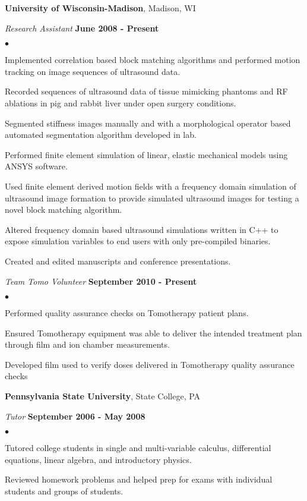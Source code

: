 \documentclass[margin,line]{res}
\newenvironment{list2}{
  \begin{list}{$\bullet$}{%
      \setlength{\itemsep}{0in}
      \setlength{\parsep}{0in} \setlength{\parskip}{0in}
      \setlength{\topsep}{0in} \setlength{\partopsep}{0in}
      \setlength{\leftmargin}{0.2in}}}{\end{list}}
\begin{document}
\begin{resume}
{\bf University of Wisconsin-Madison}, Madison, WI

\vspace{-.3cm}
{\em Research Assistant} \hfill {\bf June 2008 - Present} \\
\begin{list2}
\item Implemented correlation based block matching algorithms and performed motion tracking on image sequences of ultrasound data.
\item Recorded sequences of ultrasound data of tissue mimicking phantoms and RF ablations in pig and rabbit liver under open surgery conditions.
\item Segmented stiffness images manually and with a morphological operator based automated segmentation algorithm developed in lab. 
\item Performed finite element simulation of linear, elastic mechanical models using ANSYS software.
\item Used finite element derived motion fields with a frequency domain simulation of ultrasound image formation
 to provide simulated ultrasound images for testing a novel block matching algorithm. 
\item Altered frequency domain based ultrasound simulations written in C++ to expose simulation variables to end users with only pre-compiled binaries.
\item Created and edited manuscripts and conference presentations.
\end{list2}


\vspace{-.3cm}
{\em Team Tomo Volunteer} \hfill {\bf September 2010 - Present} \\
\begin{list2}
\item Performed quality assurance checks on Tomotherapy patient plans.
\item Ensured Tomotherapy equipment was able to deliver the intended treatment plan through film and ion chamber measurements.
\item Developed film used to verify doses delivered in Tomotherapy quality assurance checks
\end{list2}

{\bf Pennsylvania State University}, State College, PA

\vspace{-.3cm}
{\em Tutor} \hfill {\bf September 2006 - May 2008} \\
\begin{list2}
\item Tutored college students in single and multi-variable calculus, differential equations, linear algebra, and introductory physics.
\item Reviewed homework problems and helped prep for exams with individual students and groups of students.
\end{list2}


\end{resume}
\end{document}
